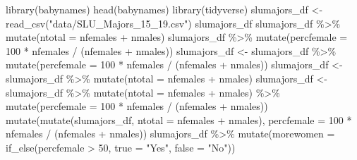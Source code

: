 \documentclass[
]{book}
\newenvironment{Shaded}{\begin{snugshade}}{\end{snugshade}}
\newcommand{\AttributeTok}[1]{\textcolor[rgb]{0.77,0.63,0.00}{#1}}
\newcommand{\DecValTok}[1]{\textcolor[rgb]{0.00,0.00,0.81}{#1}}
\newcommand{\FunctionTok}[1]{\textcolor[rgb]{0.00,0.00,0.00}{#1}}
\newcommand{\NormalTok}[1]{#1}
\newcommand{\OtherTok}[1]{\textcolor[rgb]{0.56,0.35,0.01}{#1}}
\newcommand{\SpecialCharTok}[1]{\textcolor[rgb]{0.00,0.00,0.00}{#1}}
\newcommand{\StringTok}[1]{\textcolor[rgb]{0.31,0.60,0.02}{#1}}
\begin{document}
\begin{Shaded}
\begin{Highlighting}[]
\FunctionTok{library}\NormalTok{(babynames)}
\FunctionTok{head}\NormalTok{(babynames)}
\FunctionTok{library}\NormalTok{(tidyverse)}
\NormalTok{slumajors\_df }\OtherTok{\textless{}{-}} \FunctionTok{read\_csv}\NormalTok{(}\StringTok{"data/SLU\_Majors\_15\_19.csv"}\NormalTok{)}
\NormalTok{slumajors\_df}
\NormalTok{slumajors\_df }\SpecialCharTok{\%\textgreater{}\%} \FunctionTok{mutate}\NormalTok{(}\AttributeTok{ntotal =}\NormalTok{ nfemales }\SpecialCharTok{+}\NormalTok{ nmales)}
\NormalTok{slumajors\_df }\SpecialCharTok{\%\textgreater{}\%}
  \FunctionTok{mutate}\NormalTok{(}\AttributeTok{percfemale =} \DecValTok{100} \SpecialCharTok{*}\NormalTok{ nfemales }\SpecialCharTok{/}\NormalTok{ (nfemales }\SpecialCharTok{+}\NormalTok{ nmales))}
\NormalTok{slumajors\_df }\OtherTok{\textless{}{-}}\NormalTok{ slumajors\_df }\SpecialCharTok{\%\textgreater{}\%}
  \FunctionTok{mutate}\NormalTok{(}\AttributeTok{percfemale =} \DecValTok{100} \SpecialCharTok{*}\NormalTok{ nfemales }\SpecialCharTok{/}\NormalTok{ (nfemales }\SpecialCharTok{+}\NormalTok{ nmales))}
\NormalTok{slumajors\_df }\OtherTok{\textless{}{-}}\NormalTok{ slumajors\_df }\SpecialCharTok{\%\textgreater{}\%} \FunctionTok{mutate}\NormalTok{(}\AttributeTok{ntotal =}\NormalTok{ nfemales }\SpecialCharTok{+}\NormalTok{ nmales)}
\NormalTok{slumajors\_df }\OtherTok{\textless{}{-}}\NormalTok{ slumajors\_df }\SpecialCharTok{\%\textgreater{}\%}
  \FunctionTok{mutate}\NormalTok{(}\AttributeTok{ntotal =}\NormalTok{ nfemales }\SpecialCharTok{+}\NormalTok{ nmales) }\SpecialCharTok{\%\textgreater{}\%}
  \FunctionTok{mutate}\NormalTok{(}\AttributeTok{percfemale =} \DecValTok{100} \SpecialCharTok{*}\NormalTok{ nfemales }\SpecialCharTok{/}\NormalTok{ (nfemales }\SpecialCharTok{+}\NormalTok{ nmales))}
\FunctionTok{mutate}\NormalTok{(}\FunctionTok{mutate}\NormalTok{(slumajors\_df, }\AttributeTok{ntotal =}\NormalTok{ nfemales }\SpecialCharTok{+}\NormalTok{ nmales), }\AttributeTok{percfemale =} \DecValTok{100} \SpecialCharTok{*}\NormalTok{ nfemales }\SpecialCharTok{/}\NormalTok{ (nfemales }\SpecialCharTok{+}\NormalTok{ nmales))}
\NormalTok{slumajors\_df }\SpecialCharTok{\%\textgreater{}\%} \FunctionTok{mutate}\NormalTok{(}\AttributeTok{morewomen =} \FunctionTok{if\_else}\NormalTok{(percfemale }\SpecialCharTok{\textgreater{}} \DecValTok{50}\NormalTok{,}
                                            \AttributeTok{true =} \StringTok{"Yes"}\NormalTok{,}
                                            \AttributeTok{false =} \StringTok{"No"}\NormalTok{))}

\end{Highlighting}
\end{Shaded}
\end{document}
